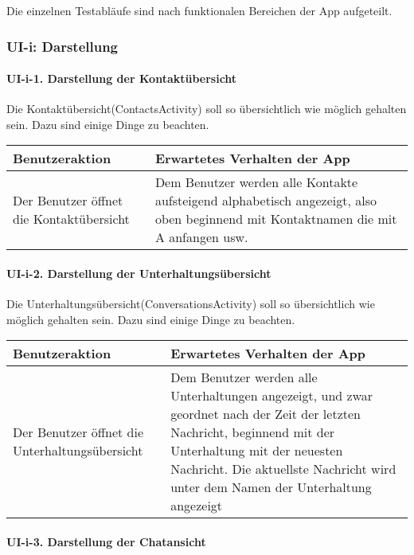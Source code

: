 
Die einzelnen Testabläufe sind nach funktionalen Bereichen der App
aufgeteilt.



\subsubsection{UI-i: Darstellung}\label{i-darstellung}

\paragraph{UI-i-1. Darstellung der
Kontaktübersicht}\label{darstellung-der-kontaktuxfcbersicht}

Die Kontaktübersicht(ContactsActivity) soll so übersichtlich wie möglich
gehalten sein. Dazu sind einige Dinge zu beachten.

\begin{longtable}{|p{8cm}|p{8.5cm}|}
\hline
Benutzeraktion & Erwartetes Verhalten der App\tabularnewline
\hline

Der Benutzer öffnet die Kontaktübersicht & Dem Benutzer werden alle
Kontakte aufsteigend alphabetisch angezeigt, also oben beginnend mit
Kontaktnamen die mit A anfangen usw.\tabularnewline
\hline
\end{longtable}

\paragraph{UI-i-2. Darstellung der
Unterhaltungsübersicht}\label{darstellung-der-unterhaltungsuxfcbersicht}

Die Unterhaltungsübersicht(ConversationsActivity) soll so übersichtlich
wie möglich gehalten sein. Dazu sind einige Dinge zu beachten.

\begin{longtable}{|p{8cm}|p{8.5cm}|}
\hline
Benutzeraktion & Erwartetes Verhalten der App\tabularnewline
\hline

Der Benutzer öffnet die Unterhaltungsübersicht & Dem Benutzer werden
alle Unterhaltungen angezeigt, und zwar geordnet nach der Zeit der
letzten Nachricht, beginnend mit der Unterhaltung mit der neuesten
Nachricht. Die aktuellste Nachricht wird unter dem Namen der
Unterhaltung angezeigt\tabularnewline
\hline
\end{longtable}

\paragraph{UI-i-3. Darstellung der
Chatansicht}\label{darstellung-der-chatansicht}

